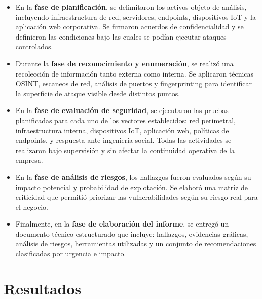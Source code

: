 \documentclass[a4paper, 10pt]{article}
\begin{document}
\begin{itemize}
    \item En la \textbf{fase de planificación}, se delimitaron los activos objeto de análisis, incluyendo infraestructura de red, servidores, endpoints, dispositivos IoT y la aplicación web corporativa. Se firmaron acuerdos de confidencialidad y se definieron las condiciones bajo las cuales se podían ejecutar ataques controlados.
    
    \item Durante la \textbf{fase de reconocimiento y enumeración}, se realizó una recolección de información tanto externa como interna. Se aplicaron técnicas OSINT, escaneos de red, análisis de puertos y fingerprinting para identificar la superficie de ataque visible desde distintos puntos.
    
    \item En la \textbf{fase de evaluación de seguridad}, se ejecutaron las pruebas planificadas para cada uno de los vectores establecidos: red perimetral, infraestructura interna, dispositivos IoT, aplicación web, políticas de endpoints, y respuesta ante ingeniería social. Todas las actividades se realizaron bajo supervisión y sin afectar la continuidad operativa de la empresa.
    
    \item En la \textbf{fase de análisis de riesgos}, los hallazgos fueron evaluados según su impacto potencial y probabilidad de explotación. Se elaboró una matriz de criticidad que permitió priorizar las vulnerabilidades según su riesgo real para el negocio.
    
    \item Finalmente, en la \textbf{fase de elaboración del informe}, se entregó un documento técnico estructurado que incluye: hallazgos, evidencias gráficas, análisis de riesgos, herramientas utilizadas y un conjunto de recomendaciones clasificadas por urgencia e impacto.
\end{itemize}

\par\vspace{0.4cm}






\clearpage

\section{Resultados}
\end{document}
